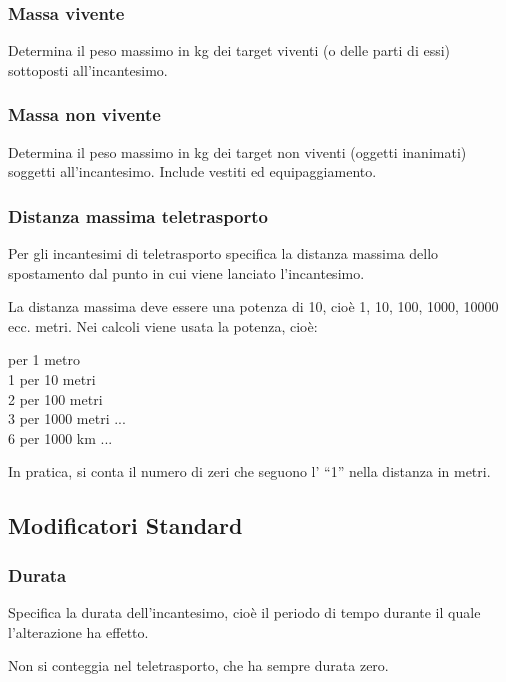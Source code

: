 
\subsubsection{Massa vivente}
Determina il peso massimo in kg dei target viventi (o delle parti di
essi) sottoposti all'incantesimo.

\subsubsection{Massa non vivente} Determina
il peso massimo in kg dei target non viventi (oggetti inanimati)
soggetti all'incantesimo. Include vestiti ed equipaggiamento.

\subsubsection{Distanza massima teletrasporto} Per gli incantesimi di
teletrasporto specifica la distanza
massima dello spostamento dal punto in cui viene lanciato
l'incantesimo.

La distanza massima deve essere una potenza di 10, cio\`e 1, 10,
100, 1000, 10000 ecc. metri. Nei calcoli viene usata la potenza,
cio\`e:

 per 1 metro \\
1 per 10 metri \\
2 per 100 metri \\
3 per 1000 metri ... \\
6 per 1000 km ... 

In pratica, si conta il numero di zeri che seguono l' ``1'' nella distanza in metri.

\subsection{Modificatori Standard}

\subsubsection{Durata}

Specifica la durata dell'incantesimo, cio\`e il periodo di tempo
durante il quale l'alterazione ha effetto.

Non si conteggia nel teletrasporto, che ha sempre durata zero.

